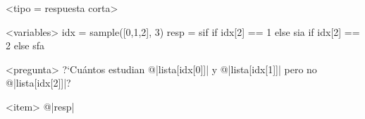 <tipo = respuesta corta>

<variables>
idx = sample([0,1,2], 3)
resp = sif if idx[2] == 1 else sia if idx[2] == 2 else sfa

<pregunta>
?`Cu\'antos estudian @|lista[idx[0]]| y @|lista[idx[1]]| pero no 
@|lista[idx[2]]|?

<item>
@|resp|
